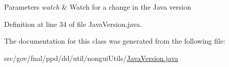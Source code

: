\begin{DoxyParams}{Parameters}
{\em watch} & Watch for a change in the Java version \\
\hline
\end{DoxyParams}


Definition at line 34 of file Java\-Version.\-java.



The documentation for this class was generated from the following file\-:\begin{DoxyCompactItemize}
\item 
src/gov/fnal/ppd/dd/util/nongui\-Utils/\hyperlink{JavaVersion_8java}{Java\-Version.\-java}\end{DoxyCompactItemize}
